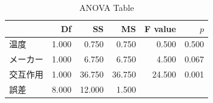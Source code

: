 \begin{table}[ht]
	\centering
	\caption{ANOVA Table}
	\begin{tabular}{lrrrrr}
		\hline
		     & Df    & SS     & MS     & F value & $p$   \\
		\hline
		温度   & 1.000 & 0.750  & 0.750  & 0.500   & 0.500 \\
		メーカー & 1.000 & 6.750  & 6.750  & 4.500   & 0.067 \\
		交互作用 & 1.000 & 36.750 & 36.750 & 24.500  & 0.001 \\
		誤差   & 8.000 & 12.000 & 1.500  &         &       \\
		\hline
	\end{tabular}
	\label{tbl::22_04}
\end{table}
